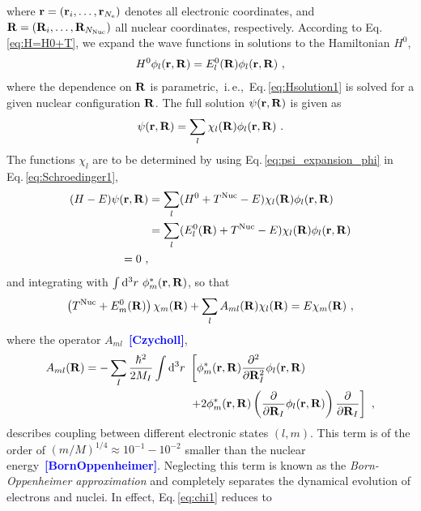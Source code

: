 \documentclass[a4paper,12pt]{book}
\renewcommand{\d}{{\rm d}}
\newcommand{\CITE}[1]{\textcolor{blue}{{\bf [#1]}}}
\begin{document}
where \mbox{${\bf r} = ({\bf r}_i, \ldots, {\bf r}_{N_{\rm e}})$} denotes all electronic coordinates, and ${\bf R} = ({\bf R}_i, \ldots, {\bf R}_{N_{\rm Nuc}})$ all nuclear coordinates, respectively. According to Eq.\,\eqref{eq:H=H0+T}, we expand the wave functions in solutions to the Hamiltonian $H^0$,
\begin{align}
    H^0 \phi_l ({\bf r}, {\bf R})
        = E^0_l ({\bf R}) \phi_l ({\bf r}, {\bf R})~,
    \label{eq:Hsolution1}
\end{align}
where the dependence on $\bf R$ is parametric,~i.\,e.,~Eq.\,\eqref{eq:Hsolution1} is solved for a given nuclear configuration $\bf R$.
The full solution $\psi ({\bf r}, {\bf R})$ is given as
\begin{align}
    \psi ({\bf r}, {\bf R}) = \sum_l \chi_l ({\bf R}) \phi_l ({\bf r}, {\bf R})~.
    \label{eq:psi_expansion_phi}
\end{align}
The functions $\chi_l$ are to be determined by using Eq.\,\eqref{eq:psi_expansion_phi} in Eq.\,\eqref{eq:Schroedinger1},
\begin{align}
    (H - E) \psi ({\bf r}, {\bf R})
        & = \sum_l (H^0 + T^{\rm Nuc} - E) \chi_l ({\bf R}) \phi_l ({\bf r}, {\bf R}) \nonumber \\
        &= \sum_l (E^0_l({\bf R}) + T^{\rm Nuc} - E) \chi_l ({\bf R}) \phi_l ({\bf r}, {\bf R}) \\
    = 0 \nonumber~,
\end{align}
and integrating with $\int \d^3 r ~ \phi^\ast_m ({\bf r}, {\bf R})$, so that
\begin{align}
    \left( T^{\rm Nuc} + E^0_m({\bf R}) \right) \chi_m ({\bf R})
        + \sum_l A_{ml} ({\bf R}) \chi_l ({\bf R})
        = E \chi_m ({\bf R})~,
    \label{eq:chi1}
\end{align}
where the operator $A_{ml}$~\CITE{Czycholl},
\begin{align}
    A_{ml} ({\bf R})
        = - \sum_I \frac{\hbar^2}{2 M_I} \int \d^3 r ~ 
        &\left[ \phi^\ast_m ({\bf r}, {\bf R}) \frac{\partial^2}{\partial {\bf R}_I^2}
            \phi_l ({\bf r}, {\bf R}) \right. \nonumber \\
        &\left.
            + 2 \phi^\ast_m ({\bf r}, {\bf R}) \left(
                \frac{\partial}{\partial {\bf R}_I} \phi_l ({\bf r}, {\bf R}) \right)
            \frac{\partial}{\partial {\bf R}_I}
        \right]~,
    \label{eq:Aml}
\end{align}
describes coupling between different electronic states $(l, m)$. This term is of the order of $(m/M)^{1/4} \approx 10^{-1} - 10^{-2}$ smaller than the nuclear energy~\CITE{BornOppenheimer}. Neglecting this term is known as the \emph{Born-Oppenheimer approximation} and completely separates the dynamical evolution of electrons and nuclei. In effect, Eq.\,\eqref{eq:chi1} reduces to
\end{document}
